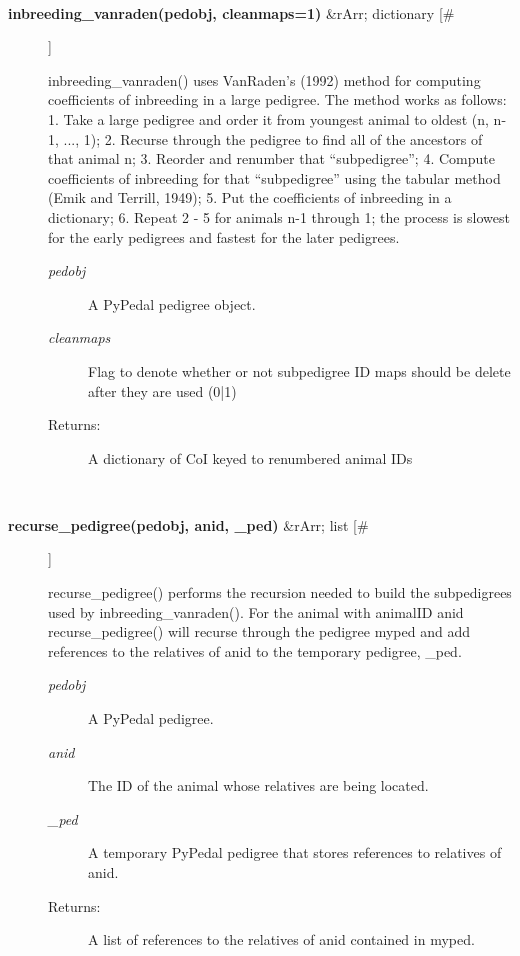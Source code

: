 \begin{description}
\begin{description}
\end{description}
\\ 

\item[\textbf{inbreeding\_vanraden(pedobj, cleanmaps=1)}
 \&rArr; dictionary [\#]]

 inbreeding\_vanraden() uses VanRaden's (1992) method for computing coefficients of inbreeding in a large pedigree. The method works as follows: 1. Take a large pedigree and order it from youngest animal to oldest (n, n-1, ..., 1); 2. Recurse through the pedigree to find all of the ancestors of that animal n; 3. Reorder and renumber that ``subpedigree''; 4. Compute coefficients of inbreeding for that ``subpedigree'' using the tabular method (Emik and Terrill, 1949); 5. Put the coefficients of inbreeding in a dictionary; 6. Repeat 2 - 5 for animals n-1 through 1; the process is slowest for the early pedigrees and fastest for the later pedigrees.
\begin{description}
\item[\emph{pedobj}
] A PyPedal pedigree object.
\item[\emph{cleanmaps}
] Flag to denote whether or not subpedigree ID maps should be delete after they are used (0|1)
\item[Returns:] A dictionary of CoI keyed to renumbered animal IDs

\end{description}
\\ 

\item[\textbf{recurse\_pedigree(pedobj, anid, \_ped)}
 \&rArr; list [\#]]

 recurse\_pedigree() performs the recursion needed to build the subpedigrees used by inbreeding\_vanraden(). For the animal with animalID anid recurse\_pedigree() will recurse through the pedigree myped and add references to the relatives of anid to the temporary pedigree, \_ped.
\begin{description}
\item[\emph{pedobj}
] A PyPedal pedigree.
\item[\emph{anid}
] The ID of the animal whose relatives are being located.
\item[\emph{\_ped}
] A temporary PyPedal pedigree that stores references to relatives of anid.
\item[Returns:] A list of references to the relatives of anid contained in myped.

\end{description}
\\ 


\end{description}

